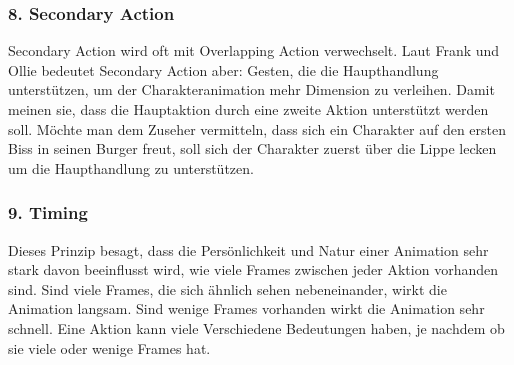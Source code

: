 \subsubsection{8. Secondary Action}
Secondary Action wird oft mit Overlapping Action verwechselt. 
Laut Frank und Ollie bedeutet Secondary Action aber: Gesten, die die Haupthandlung unterstützen, um der Charakteranimation mehr Dimension zu verleihen. 
Damit meinen sie, dass die Hauptaktion durch eine zweite Aktion unterstützt werden soll. Möchte man dem Zuseher vermitteln, dass sich ein 
Charakter auf den ersten Biss in seinen Burger freut, soll sich der Charakter zuerst über die Lippe lecken um die Haupthandlung zu unterstützen. 

\subsubsection{9. Timing}
Dieses Prinzip besagt, dass die Persönlichkeit und Natur einer Animation sehr stark davon beeinflusst wird, wie viele Frames zwischen jeder Aktion
 vorhanden sind. Sind viele Frames, die sich ähnlich sehen nebeneinander, wirkt die Animation langsam. Sind wenige Frames vorhanden wirkt die Animation sehr schnell. 
Eine Aktion kann viele Verschiedene Bedeutungen haben, je nachdem ob sie viele oder wenige Frames hat.   

